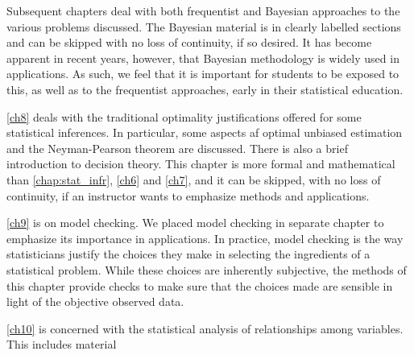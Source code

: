 Subsequent chapters deal with both frequentist and Bayesian approaches to the various problems discussed. The Bayesian material is in clearly labelled sections and can be skipped with no loss of continuity, if so desired. It has become apparent in recent years, however, that Bayesian methodology is widely used in applications. As such, we feel that it is important for students to be exposed to this, as well as to the frequentist approaches, early in their statistical education.

\autoref{ch8} deals with the traditional optimality justifications offered  for some statistical inferences. In particular, some aspects af optimal unbiased estimation and the Neyman-Pearson theorem are discussed. There is also a brief introduction to decision theory. This chapter is more formal and mathematical than  \autoref{chap:stat_infr}, \autoref{ch6} and \autoref{ch7}, and it can be skipped, with no loss of continuity, if an instructor wants to emphasize methods and applications.

\autoref{ch9} is on model checking. We placed model checking in separate chapter to emphasize its importance in applications. In practice, model checking is the way statisticians justify the choices they make in selecting the ingredients of a statistical problem. While these choices are inherently subjective, the methods of this chapter provide checks to make sure that the choices made are sensible in light of the objective observed data.

\autoref{ch10} is concerned with the statistical analysis of relationships among variables. This includes material